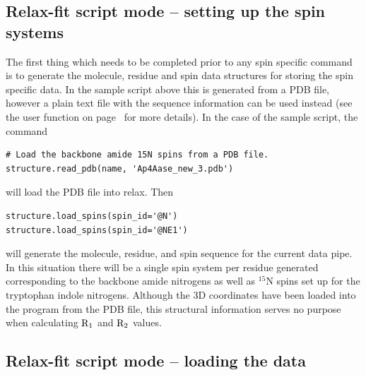 
\subsection{Relax-fit script mode -- setting up the spin systems}

The first thing which needs to be completed prior to any spin specific command is to generate the molecule, residue and spin data structures for storing the spin specific data.
In the sample script above this is generated from a PDB file, however a plain text file with the sequence information can be used instead (see the  user function on page~\pageref{uf: sequence.read} for more details).
In the case of the sample script, the command

\begin{lstlisting}[firstnumber=6]
# Load the backbone amide 15N spins from a PDB file.
structure.read_pdb(name, 'Ap4Aase_new_3.pdb')
\end{lstlisting}

will load the PDB file  into relax.
Then 

\begin{lstlisting}[firstnumber=8]
structure.load_spins(spin_id='@N')
structure.load_spins(spin_id='@NE1')
\end{lstlisting}

will generate the molecule, residue, and spin sequence for the current data pipe.
In this situation there will be a single spin system per residue generated corresponding to the backbone amide nitrogens as well as $^{15}$N spins set up for the tryptophan indole nitrogens.
Although the 3D coordinates have been loaded into the program from the PDB file, this structural information serves no purpose when calculating $\mathrm{R}_1$ and $\mathrm{R}_2$ values.



\subsection{Relax-fit script mode -- loading the data} \label{sect: Rx data loading}

